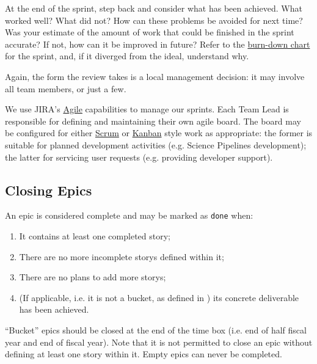 \begin{enumerate}
  At the end of the sprint, step back and consider what has been
  achieved. What worked well? What did not? How can these problems be
  avoided for next time? Was your estimate of the amount of work that
  could be finished in the sprint accurate? If not, how can it be
  improved in future? Refer to the
  \href{https://en.wikipedia.org/wiki/Burn_down_chart}{burn-down chart}
  for the sprint, and, if it diverged from the ideal, understand why.

  Again, the form the review takes is a local management decision: it
  may involve all team members, or just a few.
\end{enumerate}

We use \gls{JIRA}'s
\href{https://www.atlassian.com/software/jira/agile}{Agile} capabilities
to manage our sprints. Each Team Lead is responsible for
defining and maintaining their own agile board. The board may be
configured for either
\href{https://en.wikipedia.org/wiki/Scrum_(software_development)}{Scrum}
or \href{https://en.wikipedia.org/wiki/Kanban_(development)}{Kanban}
style work as appropriate: the former is suitable for planned
development activities (e.g. \gls{Science Pipelines} development); the latter
for servicing user requests (e.g. providing developer support).

\subsection{Closing Epics}
\label{sec:epic-close}


An \gls{epic} is considered complete and may be marked as \texttt{done} when:

\begin{enumerate}
\item It contains at least one completed \gls{story};
\item There are no more incomplete \glspl{story} defined within it;
\item There are no plans to add more \glspl{story};
\item (If applicable, i.e. it is not a bucket, as defined in ) its concrete deliverable has been achieved.
\end{enumerate}

``Bucket'' epics should be closed at the end of the time box (i.e. end of half fiscal year and end of fiscal year).
Note that it is not permitted to close an \gls{epic} without defining at least one \gls{story} within it.
Empty \glspl{epic} can never be completed.


